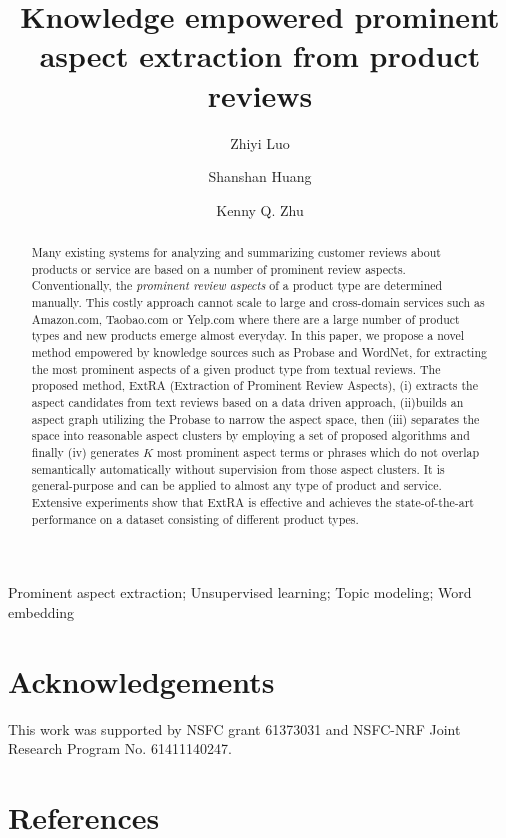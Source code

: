 \documentclass[preprint, 10pt]{elsarticle}
\begin{document}
\begin{frontmatter}

\title{Knowledge empowered prominent aspect extraction from
	product reviews}

\author{Zhiyi Luo}
\author{Shanshan Huang} 
\author{Kenny Q. Zhu}
\address[mymainaddress]{Department of Computer Science and Engineering, Shanghai Jiao Tong University}
\address[mysecondaryaddress]{ 800 Dongchuan Road, Shanghai, China 200240}

\begin{abstract}
	Many existing systems for analyzing and summarizing customer reviews about 
	products or service are based on a number of prominent review aspects. 
	Conventionally, the {\em prominent review aspects} of a product type 
	are determined manually. This costly approach cannot scale to large and 
	cross-domain services such as Amazon.com, Taobao.com or Yelp.com where 
	there are a large number of product types and
	new products emerge almost everyday. 
	In this paper, we propose a novel method empowered by
	knowledge sources such as
	Probase and WordNet, 
	for extracting the 
	most prominent aspects of a given product type  from textual reviews. 
	The proposed method, 
	ExtRA (Extraction of Prominent Review Aspects), 
	(i) extracts the aspect candidates from text reviews based on a
	data driven approach,
	(ii)builds an aspect graph utilizing the Probase to narrow the aspect space, 
	then (iii) separates the space into reasonable aspect clusters by employing a set of	proposed algorithms and finally
	(iv) generates $K$ most prominent aspect terms 
	or phrases which do not overlap semantically automatically without	supervision from those aspect clusters.
	It is general-purpose and can be applied to 
	almost any type of product and service. 
	Extensive experiments show that ExtRA is effective and achieves 
	the state-of-the-art performance on a dataset consisting of 
	different product types.
\end{abstract}

\begin{keyword}
Prominent aspect extraction; Unsupervised learning; Topic modeling; Word embedding
\end{keyword}

\end{frontmatter}

\linenumbers











\section*{Acknowledgements}
This work was supported by NSFC grant 61373031
and NSFC-NRF Joint Research Program No. 61411140247.

\section*{References}


\end{document}
